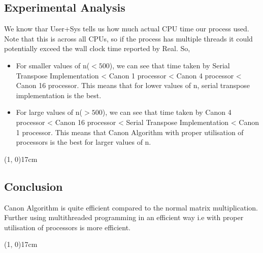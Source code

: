 \documentclass[10pt]{article}
\begin{document}
\begin{center}
 \section*{Experimental Analysis}
 \end{center}
 
 We know thar User+Sys tells us how much actual CPU time our process used. Note that this is across all CPUs, so if the process has multiple threads it could potentially exceed the wall clock time reported by Real. So,\\
 
\begin{itemize}

\item For smaller values of n($<500$), we can see that time taken by Serial Transpose Implementation < Canon 1 processor < Canon 4 processor < Canon 16 processor. This means that for lower values of n, serial transpose implementation is the best.

\item For large values of n($>500$), we can see that time taken by Canon 4 processor < Canon 16 processor < Serial Transpose Implementation < Canon 1 processor. This means that Canon Algorithm with proper utilisation of processors is the best for larger values of n.   

 \end{itemize}
 
 \begin{center}
	\line(1, 0){17cm}
\end{center}


\begin{center}
 \section*{Conclusion}
\end{center}

Canon Algorithm is quite efficient compared to the normal matrix multiplication. Further using multithreaded programming in an efficient way i.e with proper utilisation of processors is more efficient.

 \begin{center}
	\line(1, 0){17cm}
\end{center}

\pagebreak
\end{document}

